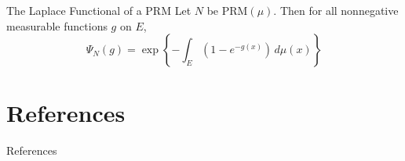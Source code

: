 \documentclass{beamer}
\begin{document}
\begin{frame}{The Laplace Functional of a PRM}
    Let $N$ be $\text{PRM}(\mu)$. Then for all nonnegative measurable functions $g$ on $E$,
    \[
    \Psi_N(g) = \exp\left\{-\int_E \left(1 - e^{-g(x)}\right)\,d\mu(x)\right\}
    \]
\end{frame}

\section{References}

\begin{frame}[allowframebreaks]{References}
    \nocite{*}
    \printbibliography
\end{frame}
\end{document}
